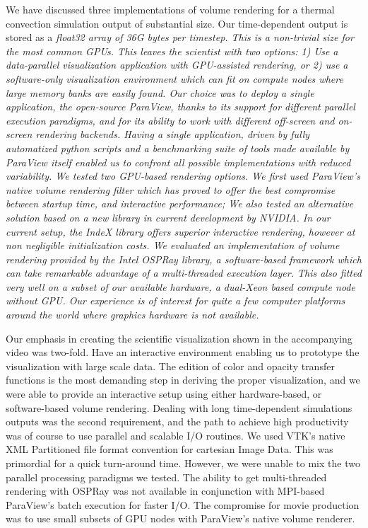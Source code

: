 \documentclass[final,5p,times,twocolumn]{elsarticle}
\begin{document}
We have discussed three implementations of volume rendering for a thermal convection
simulation output of substantial size. Our time-dependent output is stored as a
\it{float32} \rm array of 36G bytes per timestep. This is a non-trivial size for the most common
GPUs. This leaves the scientist with two options: 1) Use a data-parallel visualization
application with GPU-assisted rendering, or 2) use a \it{software-only} \rm
visualization environment which can fit on compute nodes where large memory
banks are easily found. Our choice was to deploy a single application, the open-source
ParaView, thanks to its support for different parallel execution paradigms, and for its ability to work with different off-screen and on-screen rendering backends. Having a single application,
driven by fully automatized python scripts and a benchmarking suite of tools made
available by ParaView itself enabled us to confront all possible implementations with reduced variability.
\newline
We tested two GPU-based rendering options. We first used ParaView's native volume rendering
filter which has proved to offer the best compromise between startup time, and interactive performance; We also tested an alternative solution based on a new library in current development by NVIDIA. In our current setup, the IndeX library offers superior interactive rendering, however at non negligible initialization costs.
\newline
We evaluated an implementation of volume rendering provided by the Intel OSPRay library,
a software-based framework which can take remarkable advantage of a multi-threaded
execution layer. This also fitted very well on a subset of our available hardware, a dual-Xeon based compute node without GPU. Our experience is of interest for quite a few computer platforms around the world where graphics hardware is not available. 

Our emphasis in creating the scientific visualization shown in the accompanying video was two-fold. Have an interactive environment enabling us to prototype the visualization with large scale data. The edition of color and opacity transfer functions is the most demanding step in
deriving the proper visualization, and we were able to provide an interactive setup using either hardware-based, or software-based volume rendering. Dealing with long time-dependent simulations outputs was the second requirement, and the path to achieve high productivity was of course to use parallel and scalable I/O routines. We used VTK's native XML Partitioned file format convention for cartesian Image Data. This was primordial for a quick turn-around time. However, we were unable to mix the two parallel processing paradigms we tested. The ability to get multi-threaded rendering with OSPRay was not available in conjunction with MPI-based ParaView's batch execution for faster I/O. The compromise for movie production was to use small subsets of GPU nodes with ParaView's native volume renderer.
\end{document}
